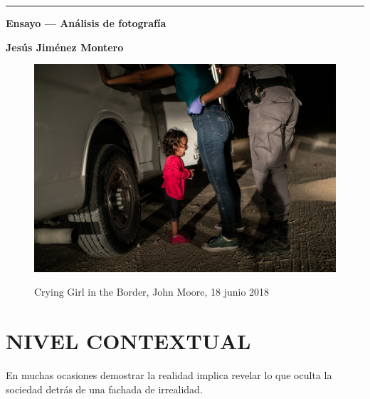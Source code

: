 \documentclass[11pt]{article}
\begin{document}
\begin{titlepage}

	\centering
	\hrule
	\vspace{1cm}
	{\bfseries\Huge Ensayo --- Análisis de fotografía \par}
	\vspace{0.5cm}
	\large{\textbf{Jesús Jiménez Montero} \par}

	\vspace{1cm}

	\begin{figure}[H]

		\includegraphics[width=\textwidth,height=\textheight,keepaspectratio]{Images/WPPF-2019PhotoContest-POYNominee-JohnMoore.jpg}
		\caption{{Crying Girl in the Border, John Moore, 18 junio 2018}}\cite{moore-2018}
		\label{fig:foto}

	\end{figure}

	\vspace{0.5cm}

	\vspace{1cm}
	\hrulefill
\end{titlepage}
\newpage

\section{NIVEL CONTEXTUAL}

En muchas ocasiones demostrar la realidad implica revelar lo que oculta la sociedad detrás de una fachada de irrealidad. \newline
\end{document}
